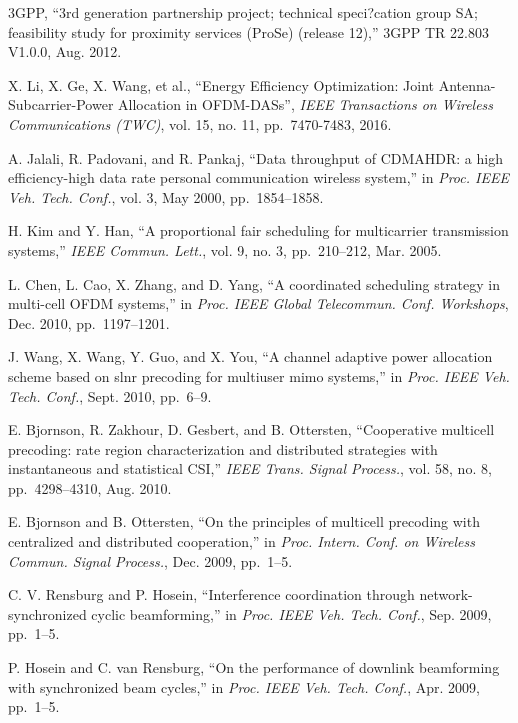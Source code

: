 \documentclass[conference]{IEEEtran}
\begin{document}
\begin{thebibliography}{10}
   3GPP, ``3rd generation partnership project; technical speci?cation group SA; feasibility study for proximity services (ProSe) (release 12),'' 3GPP TR 22.803 V1.0.0, Aug. 2012.
  
  X. Li, X. Ge, X. Wang, et al., ``Energy Efficiency Optimization: Joint Antenna-Subcarrier-Power Allocation in OFDM-DASs'',
  \emph{IEEE Transactions on Wireless Communications (TWC)}, vol. 15, no. 11, pp.~7470-7483, 2016.
  
  A. Jalali, R. Padovani, and R. Pankaj, ``Data throughput of CDMAHDR: a high efficiency-high data rate personal communication wireless
  system,'' in
  \emph{Proc. IEEE Veh. Tech. Conf.}, vol. 3, May 2000, pp.~1854--1858.
  
  H. Kim and Y. Han, ``A proportional fair scheduling for multicarrier transmission systems,''
  \emph{IEEE Commun. Lett.}, vol. 9, no. 3, pp.~210--212, Mar. 2005.
  
  L. Chen, L. Cao, X. Zhang, and D. Yang, ``A coordinated scheduling strategy in multi-cell OFDM systems,'' in
  \emph{Proc. IEEE Global Telecommun. Conf. Workshops}, Dec. 2010, pp.~1197--1201.
  
  J. Wang, X. Wang, Y. Guo, and X. You, ``A channel adaptive power allocation scheme based on slnr precoding for multiuser mimo systems,'' in
  \emph{Proc. IEEE Veh. Tech. Conf.}, Sept. 2010, pp.~6--9.
  
  E. Bjornson, R. Zakhour, D. Gesbert, and B. Ottersten, ``Cooperative multicell precoding: rate region characterization and distributed strategies with instantaneous and statistical CSI,''
  \emph{IEEE Trans. Signal Process.}, vol. 58, no. 8, pp.~4298--4310, Aug. 2010.
  
  E. Bjornson and B. Ottersten, ``On the principles of multicell precoding with centralized and distributed cooperation,'' in
  \emph{Proc. Intern. Conf. on Wireless Commun. Signal Process.}, Dec. 2009, pp.~1--5.
  
  C. V. Rensburg and P. Hosein, ``Interference coordination through network-synchronized cyclic beamforming,'' in
  \emph{Proc. IEEE Veh. Tech. Conf.}, Sep. 2009, pp.~1--5.
  
  P. Hosein and C. van Rensburg, ``On the performance of downlink beamforming with synchronized beam cycles,'' in
  \emph{Proc. IEEE Veh. Tech. Conf.}, Apr. 2009, pp.~1--5.
  

\end{thebibliography}
\end{document}
